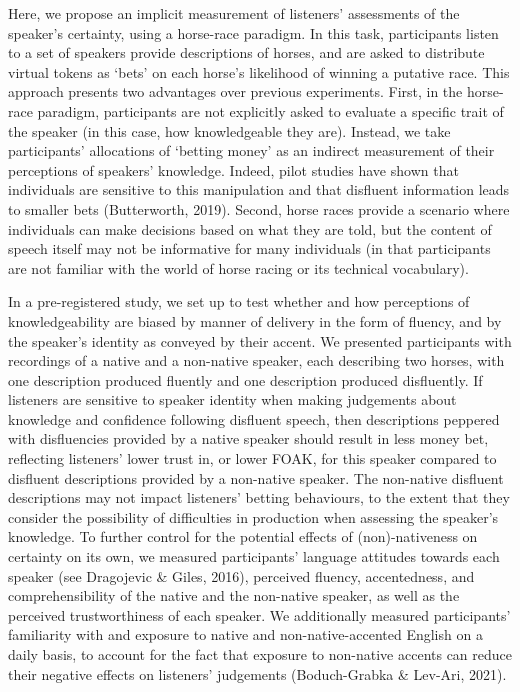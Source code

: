\documentclass[
  man,floatsintext]{apa7}
\begin{document}
Here, we propose an implicit measurement of listeners' assessments of the speaker's certainty, using a horse-race paradigm. In this task, participants listen to a set of speakers provide descriptions of horses, and are asked to distribute virtual tokens as `bets' on each horse's likelihood of winning a putative race. This approach presents two advantages over previous experiments. First, in the horse-race paradigm, participants are not explicitly asked to evaluate a specific trait of the speaker (in this case, how knowledgeable they are). Instead, we take participants' allocations of `betting money' as an indirect measurement of their perceptions of speakers' knowledge. Indeed, pilot studies have shown that individuals are sensitive to this manipulation and that disfluent information leads to smaller bets (Butterworth, 2019). Second, horse races provide a scenario where individuals can make decisions based on what they are told, but the content of speech itself may not be informative for many individuals (in that participants are not familiar with the world of horse racing or its technical vocabulary).

In a pre-registered study, we set up to test whether and how perceptions of knowledgeability are biased by manner of delivery in the form of fluency, and by the speaker's identity as conveyed by their accent. We presented participants with recordings of a native and a non-native speaker, each describing two horses, with one description produced fluently and one description produced disfluently. If listeners are sensitive to speaker identity when making judgements about knowledge and confidence following disfluent speech, then descriptions peppered with disfluencies provided by a native speaker should result in less money bet, reflecting listeners' lower trust in, or lower FOAK, for this speaker compared to disfluent descriptions provided by a non-native speaker. The non-native disfluent descriptions may not impact listeners' betting behaviours, to the extent that they consider the possibility of difficulties in production when assessing the speaker's knowledge. To further control for the potential effects of (non)-nativeness on certainty on its own, we measured participants' language attitudes towards each speaker (see Dragojevic \& Giles, 2016), perceived fluency, accentedness, and comprehensibility of the native and the non-native speaker, as well as the perceived trustworthiness of each speaker. We additionally measured participants' familiarity with and exposure to native and non-native-accented English on a daily basis, to account for the fact that exposure to non-native accents can reduce their negative effects on listeners' judgements (Boduch-Grabka \& Lev-Ari, 2021).
\end{document}
